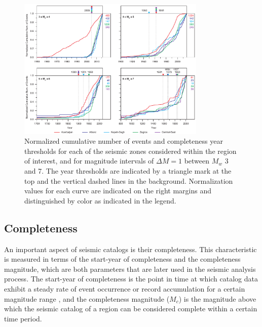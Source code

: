 
\begin{figure}[t]
    \centering
    \includegraphics[width=0.8\textwidth]{figures/pdf/figure-05.pdf}
    \caption{Normalized cumulative number of events and completeness year thresholds for each of the seismic zones considered within the region of interest, and for magnitude intervals of $\Delta M = 1$ between $M_w$ 3 and 7. The year thresholds are indicated by a triangle mark at the top and the vertical dashed lines in the background. Normalization values for each curve are indicated on the right margins and distinguished by color as indicated in the legend.}
    \label{fig:completeness}
\end{figure}

\subsection{Completeness}

An important aspect of seismic catalogs is their completeness. This characteristic is measured in terms of the start-year of completeness and the completeness magnitude, which are both parameters that are later used in the seismic analysis process. The start-year of completeness is the point in time at which catalog data exhibit a steady rate of event occurrence or record accumulation for a certain magnitude range , and the completeness magnitude ($M_c$) is the magnitude above which the seismic catalog of a region can be considered complete within a certain time period. 


